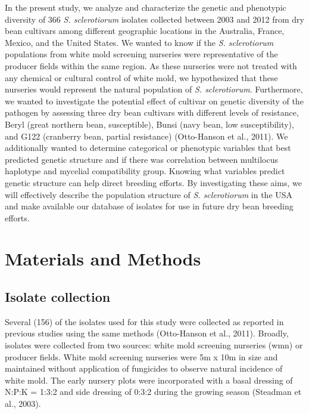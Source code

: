 \documentclass[fleqn,10pt,lineno]{wlpeerj} %
\theoremstyle{definition}
\theoremstyle{definition}
\theoremstyle{definition}
\theoremstyle{remark}
\begin{document}
In the present study, we analyze and characterize the genetic and
phenotypic diversity of 366 \emph{S. sclerotiorum} isolates collected
between 2003 and 2012 from dry bean cultivars among different geographic
locations in the Australia, France, Mexico, and the United States. We
wanted to know if the \emph{S. sclerotiorum} populations from white mold
screening nurseries were representative of the producer fields within
the same region. As these nurseries were not treated with any chemical
or cultural control of white mold, we hypothesized that these nurseries
would represent the natural population of \emph{S. sclerotiorum}.
Furthermore, we wanted to investigate the potential effect of cultivar
on genetic diversity of the pathogen by assessing three dry bean
cultivars with different levels of resistance, Beryl (great northern
bean, susceptible), Bunsi (navy bean, low susceptibility), and G122
(cranberry bean, partial resistance) (Otto-Hanson et al., 2011). We
additionally wanted to determine categorical or phenotypic variables
that best predicted genetic structure and if there was correlation
between multilocus haplotype and mycelial compatibility group. Knowing
what variables predict genetic structure can help direct breeding
efforts. By investigating these aims, we will effectively describe the
population structure of \emph{S. sclerotiorum} in the USA and make
available our database of isolates for use in future dry bean breeding
efforts.

\section*{Materials and Methods}\label{materials-and-methods}

\subsection*{Isolate collection}\label{isolate-collection}

Several (156) of the isolates used for this study were collected as
reported in previous studies using the same methods (Otto-Hanson et al.,
2011). Broadly, isolates were collected from two sources: white mold
screening nurseries (wmn) or producer fields. White mold screening
nurseries were 5m x 10m in size and maintained without application of
fungicides to observe natural incidence of white mold. The early nursery
plots were incorporated with a basal dressing of N:P:K = 1:3:2 and side
dressing of 0:3:2 during the growing season (Steadman et al., 2003).
\end{document}
